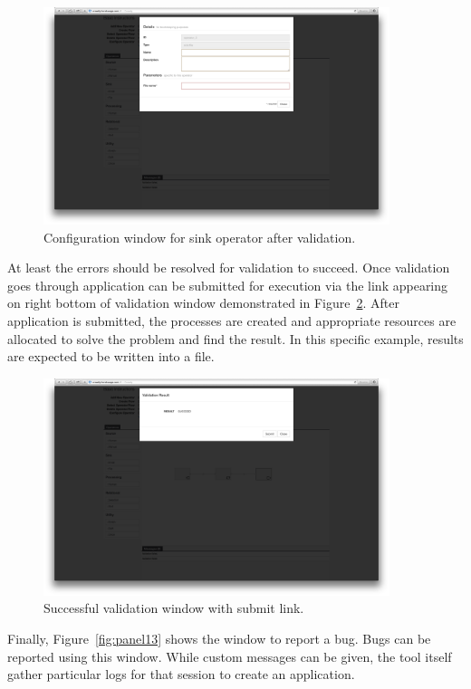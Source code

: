\begin{figure}[ht]
	\centering
	\includegraphics[width=0.9\textwidth]{figures/tool/panel11.png}
	\caption{Configuration window for sink operator after validation.}
	\label{fig:panel11}
\end{figure}

At least the errors should be resolved for validation to succeed. Once validation goes 
through application can be submitted for execution via the link appearing on right bottom 
of validation window demonstrated in Figure~\ref{fig:panel12}. After application is 
submitted, the processes are created and appropriate resources are allocated to solve 
the problem and find the result. In this specific example, results are expected to be 
written into a file.

\begin{figure}[ht]
	\centering
	\includegraphics[width=0.9\textwidth]{figures/tool/panel12.png}
	\caption{Successful validation window with submit link.}
	\label{fig:panel12}
\end{figure}

Finally, Figure~\ref{fig:panel13} shows the window to report a bug. Bugs can be 
reported using this window. While custom messages can be given, the tool itself 
gather particular logs for that session to create an application.

